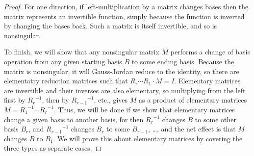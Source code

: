 \begin{proof}
For one direction, if left-multiplication by a matrix changes bases then
the matrix represents an invertible function,
simply because the function is inverted by changing the bases back.
Such a matrix is itself invertible, and so is nonsingular.

To finish, we will show that any nonsingular matrix $M$ 
performs a change of basis operation from any given starting basis $B$ 
to some ending basis.
Because the matrix is nonsingular, it will Gauss-Jordan reduce to the
identity, so there are elementatry reduction matrices such that
$R_r\cdots R_1\cdot M=I$.
Elementary matrices are invertible and their inverses are also elementary,
so multiplying from the left first
by ${R_r}^{-1}$, then by ${R_{r-1}}^{-1}$, etc., gives 
$M$ as a product of elementary matrices
$M={R_1}^{-1}\cdots {R_r}^{-1}$.
Thus, we will be done if we show that elementary matrices 
change a given basis to another basis, for then 
${R_r}^{-1}$ changes $B$ to some other basis $B_r$, and
${R_{r-1}}^{-1}$ changes $B_r$ to some $B_{r-1}$, \ldots, and
the net effect is that $M$ changes $B$ to $B_1$.
We will prove this about elementary matrices by covering the three types as
separate cases.


\end{proof}
